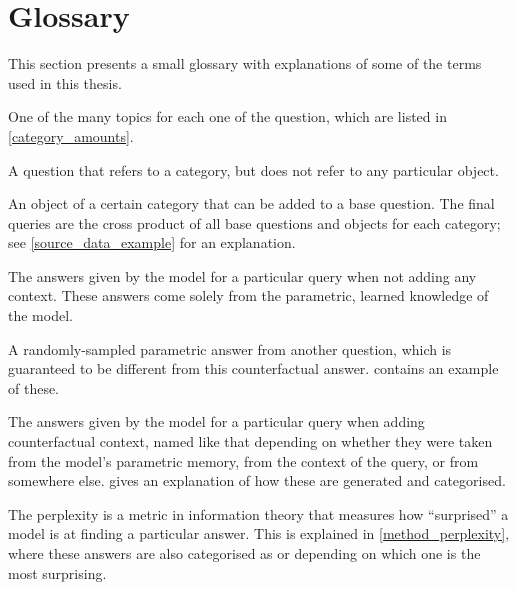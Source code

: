 \section*{Glossary}
\label{glossary}

This section presents a small glossary with explanations of some of the terms used in this thesis.

\begin{description}[style=nextline]
	\item[Category]
		One of the many topics for each one of the question, which are listed in \cref{category_amounts}.

	\item[Base Questions]
		A question that refers to a category, but does not refer to any particular object.
	\item[Objects]
		An object of a certain category that can be added to a base question.
		The final queries are the cross product of all base questions and objects for each category; see \cref{source_data_example} for an explanation.

	\item[Parametric Answers]
		The answers given by the model for a particular query when not adding any context. These answers come solely from the parametric, learned knowledge of the model.
	\item[Counterfactual Answer]
		A randomly-sampled parametric answer from another question, which is guaranteed to be different from this counterfactual answer.
		 contains an example of these.

	\item[\Parametric{}, \Contextual{}, and \Other{} answers]
		The answers given by the model for a particular query when adding counterfactual context, named like that depending on whether they were taken from the model's parametric memory, from the context of the query, or from somewhere else.
		 gives an explanation of how these are generated and categorised.

	\item[Perplexity of an answer]
		The perplexity is a metric in information theory that measures how ``surprised'' a model is at finding a particular answer.
		This is explained in \cref{method_perplexity}, where these answers are also categorised as \Parametric{} or \Contextual{} depending on which one is the most surprising.
\end{description}
